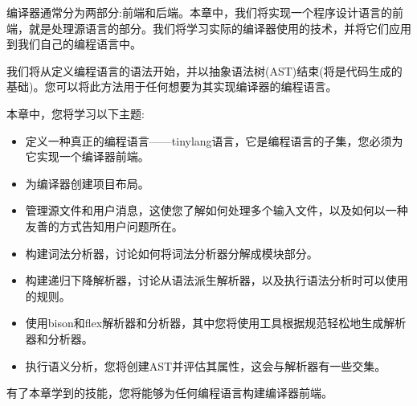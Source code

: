 编译器通常分为两部分:前端和后端。本章中，我们将实现一个程序设计语言的前端，就是处理源语言的部分。我们将学习实际的编译器使用的技术，并将它们应用到我们自己的编程语言中。\par

我们将从定义编程语言的语法开始，并以抽象语法树(AST)结束(将是代码生成的基础)。您可以将此方法用于任何想要为其实现编译器的编程语言。\par

本章中，您将学习以下主题:\par


\begin{itemize}
	\item 定义一种真正的编程语言——tinylang语言，它是编程语言的子集，您必须为它实现一个编译器前端。
	\item 为编译器创建项目布局。
	\item 管理源文件和用户消息，这使您了解如何处理多个输入文件，以及如何以一种友善的方式告知用户问题所在。
	\item 构建词法分析器，讨论如何将词法分析器分解成模块部分。
	\item 构建递归下降解析器，讨论从语法派生解析器，以及执行语法分析时可以使用的规则。
	\item 使用bison和flex解析器和分析器，其中您将使用工具根据规范轻松地生成解析器和分析器。
	\item 执行语义分析，您将创建AST并评估其属性，这会与解析器有一些交集。
\end{itemize}

有了本章学到的技能，您将能够为任何编程语言构建编译器前端。\par